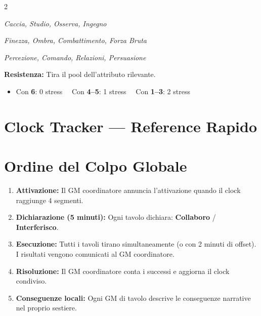 \begin{multicols}{2}
\begin{description}[leftmargin=2.5cm]
  \item[\textbf{Insight}]
    \textit{Caccia, Studio, Osserva, Ingegno}
  \item[\textbf{Prowess}]
    \textit{Finezza, Ombra, Combattimento, Forza Bruta}
  \item[\textbf{Resolve}]
    \textit{Percezione, Comando, Relazioni, Persuasione}
\end{description}

\medskip

\textbf{Resistenza:} Tira il pool dell'attributo rilevante.
\begin{itemize}
  \item Con \textbf{6}: 0 stress \ \ Con \textbf{4–5}: 1 stress \ \ Con \textbf{1–3}: 2 stress
\end{itemize}

\end{multicols}

\section{Clock Tracker — Reference Rapido}
\label{sec:ref-clocks}


\section{Ordine del Colpo Globale}
\label{sec:ref-globale}

\begin{enumerate}
  \item \textbf{Attivazione:} Il GM coordinatore annuncia l'attivazione quando
        il clock raggiunge 4 segmenti.
  \item \textbf{Dichiarazione (5 minuti):} Ogni tavolo dichiara:
        \textbf{Collaboro} / \textbf{Interferisco}.
  \item \textbf{Esecuzione:} Tutti i tavoli tirano simultaneamente
        (o con 2 minuti di offset). I risultati vengono comunicati
        al GM coordinatore.
  \item \textbf{Risoluzione:} Il GM coordinatore conta i successi
        e aggiorna il clock condiviso.
  \item \textbf{Conseguenze locali:} Ogni GM di tavolo descrive
        le conseguenze narrative nel proprio sestiere.
\end{enumerate}

